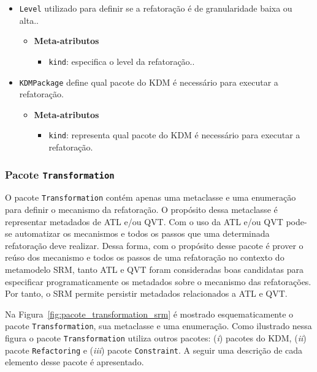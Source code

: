\begin{itemize}
\item \texttt{Level} utilizado para definir se a refatoração é de granularidade baixa ou alta..

\begin{itemize}
	\item \textbf{Meta-atributos}
		\begin{itemize}
			\item \texttt{kind}: especifica o level da refatoração..
		\end{itemize}	
\end{itemize} 

\item \texttt{KDMPackage} define qual pacote do KDM é necessário para executar a refatoração.

\begin{itemize}
	\item \textbf{Meta-atributos}
		\begin{itemize}
			\item \texttt{kind}: representa qual pacote do KDM é necessário para executar a refatoração.
		\end{itemize}	
\end{itemize} 

\end{itemize}

\subsubsection{Pacote \texttt{Transformation}}

O pacote \texttt{Transformation} contém apenas uma metaclasse e uma enumeração para definir o mecanismo da refatoração. O propósito dessa metaclasse é representar metadados de ATL e/ou QVT. Com o uso da ATL e/ou QVT pode-se automatizar os mecanismos e todos os passos que uma determinada refatoração deve realizar. Dessa forma, com o propósito desse pacote é prover o reúso dos mecanismo e todos os passos de uma refatoração no contexto do metamodelo SRM, tanto ATL e QVT foram consideradas boas candidatas para especificar programaticamente os metadados sobre o mecanismo das refatorações. Por tanto, o SRM permite persistir metadados relacionados a ATL e QVT.

Na Figura~\ref{fig:pacote_transformation_srm} é mostrado esquematicamente o pacote \texttt{Transformation}, sua metaclasse e uma enumeração. Como ilustrado nessa figura o pacote \texttt{Transformation} utiliza outros pacotes: (\textit{i}) pacotes do KDM, (\textit{ii}) pacote \texttt{Refactoring} e (\textit{iii}) pacote \texttt{Constraint}. A seguir uma descrição de cada elemento desse pacote é apresentado.

